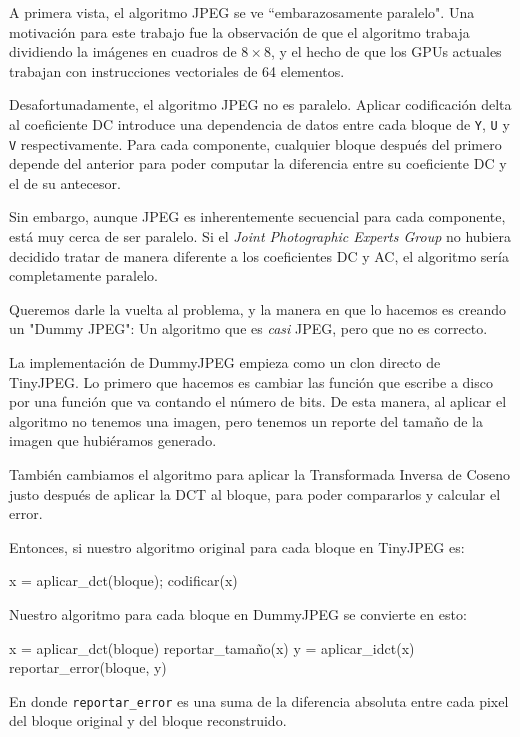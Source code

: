 A primera vista, el algoritmo JPEG se ve ``embarazosamente paralelo". Una
motivación para este trabajo fue la observación de que el algoritmo trabaja
dividiendo la imágenes en cuadros de $8\times8$, y el hecho de que los GPUs
actuales trabajan con instrucciones vectoriales de 64 elementos.

Desafortunadamente, el algoritmo JPEG no es paralelo. Aplicar codificación
delta al coeficiente DC introduce una dependencia de datos entre cada bloque de
\verb+Y+, \verb+U+ y \verb+V+ respectivamente. Para cada componente, cualquier
bloque después del primero depende del anterior para poder computar la
diferencia entre su coeficiente DC  y el de su antecesor.

Sin embargo, aunque JPEG es inherentemente secuencial para cada componente,
está muy cerca de ser paralelo. Si el \emph{Joint Photographic Experts Group}
no hubiera decidido tratar de manera diferente a los coeficientes DC y AC, el
algoritmo sería completamente paralelo.

Queremos darle la vuelta al problema, y la manera en que lo hacemos es creando
un "Dummy JPEG": Un algoritmo que es \emph{casi} JPEG, pero que no es correcto.

La implementación de DummyJPEG empieza como un clon directo de TinyJPEG. Lo
primero que hacemos es cambiar las función que escribe a disco por una función
que va contando el número de bits. De esta manera, al aplicar el algoritmo no
tenemos una imagen, pero tenemos un reporte del tamaño de la imagen que
hubiéramos generado.

También cambiamos el algoritmo para aplicar la Transformada Inversa de Coseno
justo después de aplicar la DCT al bloque, para poder compararlos y calcular el
error.

Entonces, si nuestro algoritmo original para cada bloque en TinyJPEG es:

\begin{code}
    x = aplicar_dct(bloque);
    codificar(x)
\end{code}

Nuestro algoritmo para cada bloque en DummyJPEG se convierte en esto:

\begin{code}
    x = aplicar_dct(bloque)
    reportar_tamaño(x)
    y = aplicar_idct(x)
    reportar_error(bloque, y)
\end{code}

En donde \verb+reportar_error+ es una suma de la diferencia absoluta entre cada
pixel del bloque original y del bloque reconstruido.

